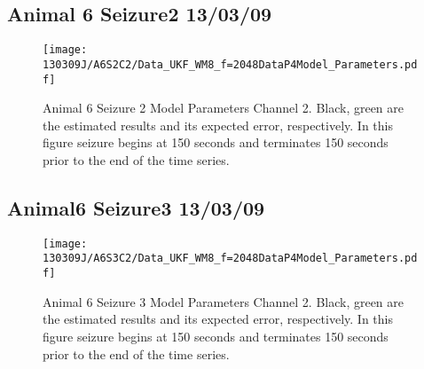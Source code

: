 \subsection{Animal 6 Seizure2 13/03/09}

\begin{figure}
	\centering
		\texttt{[image: 130309J/A6S2C2/Data\_UKF\_WM8\_f=2048DataP4Model\_Parameters.pdf]}
	\caption{Animal 6 Seizure 2 Model Parameters Channel 2. Black, green are the estimated results and its expected error, respectively. In this figure seizure begins at 150 seconds and terminates 150 seconds prior to the end of the time series.}
	\label{fig: A6S2C2 MP}
\end{figure}

\subsection{Animal6 Seizure3 13/03/09}

\begin{figure}
	\centering
		\texttt{[image: 130309J/A6S3C2/Data\_UKF\_WM8\_f=2048DataP4Model\_Parameters.pdf]}
	\caption{Animal 6 Seizure 3 Model Parameters Channel 2. Black, green are the estimated results and its expected error, respectively. In this figure seizure begins at 150 seconds and terminates 150 seconds prior to the end of the time series.}
	\label{fig: A6S3C2 MP}
\end{figure}
